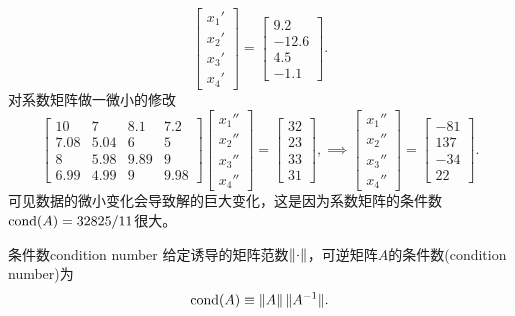 \begin{example}
\[\begin{bmatrix}
            x_1'\\x_2'\\x_3'\\x_4'
        \end{bmatrix}=\begin{bmatrix}
            9.2\\-12.6\\4.5\\-1.1
        \end{bmatrix}.
    \]
    对系数矩阵做一微小的修改
    \[
        \begin{bmatrix}
            10&7&8.1&7.2\\
            7.08&5.04&6&5\\
            8&5.98&9.89&9\\
            6.99&4.99&9&9.98
        \end{bmatrix}\begin{bmatrix}
            x_1''\\x_2''\\x_3''\\x_4''
        \end{bmatrix}=\begin{bmatrix}
            32\\23\\33\\31
        \end{bmatrix},\implies\begin{bmatrix}
            x_1''\\x_2''\\x_3''\\x_4''
        \end{bmatrix}=\begin{bmatrix}
            -81\\137\\-34\\22
        \end{bmatrix}.
    \]
    可见数据的微小变化会导致解的巨大变化，这是因为系数矩阵的条件数$\operatorname{cond}(A)=32825/11$很大。
\end{example}

\begin{definition}
    {条件数}{condition number}
    给定诱导的矩阵范数$\left\lVert\cdot\right\rVert$，可逆矩阵$A$的条件数(condition number)为
    \begin{equation}
        \operatorname{cond}(A)\equiv\left\lVert A\right\rVert\lVert A^{-1}\rVert.
    \end{equation}
\end{definition}

